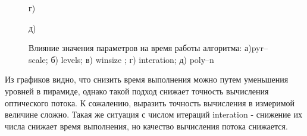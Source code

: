 \begin{figure}[!Htb]
\begin{minipage}[h]{0.47\linewidth}
\end{minipage}
\hfill
\begin{minipage}[h]{0.47\linewidth}
 г) \\
\end{minipage}

\begin{center}
	\begin{minipage}[h]{0.47\linewidth}
	 д) \\
	\end{minipage}
\end{center}
\caption{Влияние значения параметров на время работы алгоритма: а)pyr--scale; б)  levels; в) winsize ; г) interation; д) poly--n}
\label{pic:3FB_params}
\end{figure}

Из графиков видно, что снизить время выполнения можно путем уменьшения уровней в пирамиде, однако такой подход снижает точность вычисления оптического потока. К сожалению, выразить точность вычисления в измеримой величине сложно. Такая же ситуация с числом итераций interation - снижение их числа снижает время выполнения, но качество вычисления потока снижается. 


